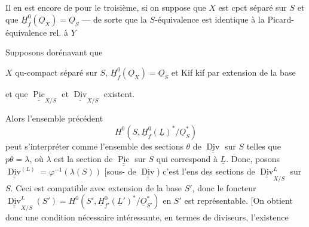 Il en est encore de  pour le troisième, si on suppose que $X$ est  cpct séparé sur $S$ et que $\underline H_f^0(\underline O_X)=\underline O_S$ --- de sorte que la $S$-équivalence est identique à la Picard-équivalence rel. à $Y$

Supposons dorénavant que

$X$ qu-compact séparé sur $S$, $\underline H_f^0(\underline O_X)=\underline O_S$ et Kif kif par extension de la base

et que $\underline{\underline{\operatorname{Pic}}}_{X/S}$ et $\underline{\underline{\operatorname{Div}}}_{X/S}$ existent.

Alors l'ensemble précédent
\[
H^0(S,\underline H_f^0(\underline L)^*/\underline O_S^*)
\]
peut s'interpréter comme l'ensemble des sections $\theta$ de $\underline{\underline{\operatorname{Div}}}$ sur $S$ telles que
$p\theta=\lambda$, où $\lambda$ est la section de $\underline{\underline{\operatorname{Pic}}}$ sur $S$ qui correspond à $\underline L$. Donc, posons $\underline{\underline{\operatorname{Div}}}^{(L)}=\varphi^{-1}(\lambda(S))$ [sous- de $\underline{\underline{\operatorname{Div}}}$) c'est l'ens des sections de $\underline{\underline{\operatorname{Div}}}_{X/S}^{L}$ sur $S$.  Ceci est compatible avec extension de la base $S'$, donc le foncteur $\underline{\underline{\operatorname{Div}}}_{X/S}^{L}(S')=H^0(S',\underline H_{f'}^0(\underline L')^*/\underline O_{S'}^*)$ en $S'$ est représentable.  [On obtient donc une condition nécessaire intéressante, en termes de diviseurs,  l'existence
